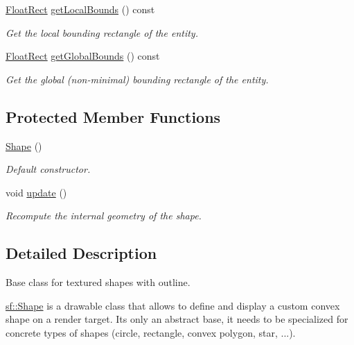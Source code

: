 \begin{DoxyCompactItemize}
\hyperlink{classsf_1_1_rect}{Float\+Rect} \hyperlink{classsf_1_1_shape_ae3294bcdf8713d33a862242ecf706443}{get\+Local\+Bounds} () const
\begin{DoxyCompactList}\small\item\em Get the local bounding rectangle of the entity. \end{DoxyCompactList}\item 
\hyperlink{classsf_1_1_rect}{Float\+Rect} \hyperlink{classsf_1_1_shape_ac0e29425d908d5442060cc44790fe4da}{get\+Global\+Bounds} () const
\begin{DoxyCompactList}\small\item\em Get the global (non-\/minimal) bounding rectangle of the entity. \end{DoxyCompactList}\end{DoxyCompactItemize}
\subsection*{Protected Member Functions}
\begin{DoxyCompactItemize}
\item 
\mbox{\label{classsf_1_1_shape_a413a457f720835b9f5d8e97ca8b80960}} 
\hyperlink{classsf_1_1_shape_a413a457f720835b9f5d8e97ca8b80960}{Shape} ()
\begin{DoxyCompactList}\small\item\em Default constructor. \end{DoxyCompactList}\item 
void \hyperlink{classsf_1_1_shape_adfb2bd966c8edbc5d6c92ebc375e4ac1}{update} ()
\begin{DoxyCompactList}\small\item\em Recompute the internal geometry of the shape. \end{DoxyCompactList}\end{DoxyCompactItemize}


\subsection{Detailed Description}
Base class for textured shapes with outline. 

\hyperlink{classsf_1_1_shape}{sf\+::\+Shape} is a drawable class that allows to define and display a custom convex shape on a render target. It\textquotesingle{}s only an abstract base, it needs to be specialized for concrete types of shapes (circle, rectangle, convex polygon, star, ...).

